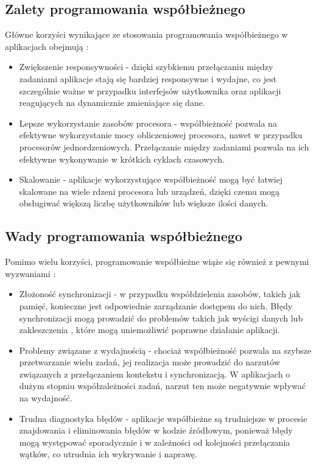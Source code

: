 \subsection{Zalety programowania współbieżnego}
Główne korzyści wynikające ze stosowania programowania współbieżnego w aplikacjach obejmują \cite{ProsAndCons, ConcurrencyInAction}:
\begin{itemize}
    \item Zwiększenie responsywności - dzięki szybkiemu przełączaniu między zadaniami aplikacje stają się bardziej responsywne i wydajne, co jest szczególnie ważne w przypadku interfejsów użytkownika oraz aplikacji reagujących na dynamicznie zmieniające się dane.
    \item Lepsze wykorzystanie zasobów procesora - współbieżność pozwala na efektywne wykorzystanie mocy obliczeniowej procesora, nawet w przypadku procesorów jednordzeniowych. Przełączanie między zadaniami pozwala na ich efektywne wykonywanie w krótkich cyklach czasowych.
    \item Skalowanie - aplikacje wykorzystujące współbieżność mogą być łatwiej skalowane na wiele rdzeni procesora lub urządzeń, dzięki czemu mogą obsługiwać większą liczbę użytkowników lub większe ilości danych.
\end{itemize}

\subsection{Wady programowania współbieżnego}
Pomimo wielu korzyści, programowanie współbieżne wiąże się również z pewnymi wyzwaniami \cite{ProsAndCons, HandsOnConcurrencywithRust}:
\begin{itemize}
    \item Złożoność synchronizacji - w przypadku współdzielenia zasobów, takich jak pamięć, konieczne jest odpowiednie zarządzanie dostępem do nich. Błędy synchronizacji mogą prowadzić do problemów takich jak wyścigi danych  lub zakleszczenia , które mogą uniemożliwić poprawne działanie aplikacji.
    \item Problemy związane z wydajnością - chociaż współbieżność pozwala na szybsze przetwarzanie wielu zadań, jej realizacja może prowadzić do narzutów związanych z przełączaniem kontekstu i synchronizacją. W aplikacjach o dużym stopniu współzależności zadań, narzut ten może negatywnie wpływać na wydajność.
    \item Trudna diagnostyka błędów - aplikacje współbieżne są trudniejsze w procesie znajdowania i eliminowania błędów w kodzie źródłowym, ponieważ błędy mogą występować sporadycznie i w zależności od kolejności przełączania wątków, co utrudnia ich wykrywanie i naprawę.
\end{itemize}

